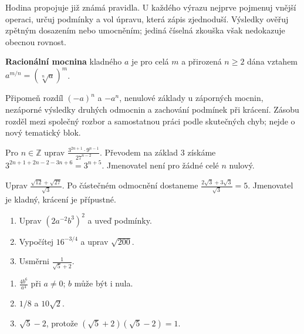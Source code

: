 \documentclass[11pt,a4paper]{article}
\begin{document}

Hodina propojuje již známá pravidla. U každého výrazu nejprve pojmenuj vnější operaci, určuj podmínky a vol úpravu, která zápis zjednoduší. Výsledky ověřuj zpětným dosazením nebo umocněním; jediná číselná zkouška však nedokazuje obecnou rovnost.

\begin{definiceBox}[title={Připomenutí definice},breakable=false]
\textbf{Racionální mocnina} kladného $a$ je pro celá $m$ a přirozená $n\ge2$ dána vztahem $a^{m/n}=(\sqrt[n]a)^m$.
\end{definiceBox}


Připomeň rozdíl $(-a)^n$ a $-a^n$, nenulové základy u záporných mocnin, nezáporné výsledky druhých odmocnin a zachování podmínek při krácení. Zásobu rozděl mezi společný rozbor a samostatnou práci podle skutečných chyb; nejde o nový tematický blok.


\begin{prikladReseniBox}[title={Příklad 1},breakable=false]
Pro $n\in\mathbb Z$ uprav $\frac{3^{2n+1}\cdot9^{n-1}}{27^{n-2}}$.
\tcblower
Převodem na základ $3$ získáme $3^{2n+1+2n-2-3n+6}=3^{n+5}$. Jmenovatel není pro žádné celé $n$ nulový.
\end{prikladReseniBox}


\begin{prikladReseniBox}[title={Příklad 2},breakable=false]
Uprav $\frac{\sqrt{12}+\sqrt{27}}{\sqrt3}$.
\tcblower
Po částečném odmocnění dostaneme $\frac{2\sqrt3+3\sqrt3}{\sqrt3}=5$. Jmenovatel je kladný, krácení je přípustné.
\end{prikladReseniBox}



\begin{zadaniReseniBox}[title={Procvičení},breakable=false]
\begin{enumerate}[label=\alph*)]
\item Uprav $(2a^{-2}b^3)^2$ a uveď podmínky.
\item Vypočítej $16^{-3/4}$ a uprav $\sqrt{200}$.
\item Usměrni $\frac1{\sqrt5+2}$.
\end{enumerate}
\tcblower
\begin{enumerate}[label=\alph*)]
\item $\frac{4b^6}{a^4}$ při $a\ne0$; $b$ může být i nula.
\item $1/8$ a $10\sqrt2$.
\item $\sqrt5-2$, protože $(\sqrt5+2)(\sqrt5-2)=1$.
\end{enumerate}
\end{zadaniReseniBox}
\end{document}
